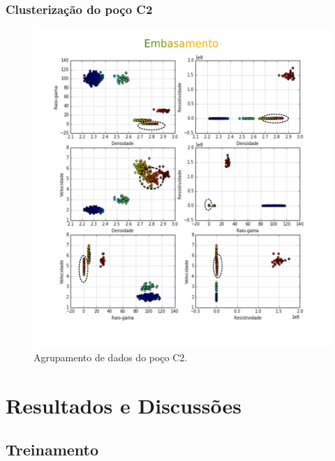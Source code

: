 \documentclass[aspectratio=10]{beamer} %
\begin{document}
\begin{frame}
\frametitle{Clusterização do poço C2}
\begin{figure}[H]
\centering
\includegraphics[scale=0.4]{Imagens/embasamentoC2.png}
\caption{Agrupamento de dados do poço C2.}
\end{figure} 
\end{frame}







\section{Resultados e Discussões}

\subsection{Treinamento}
\end{document}
